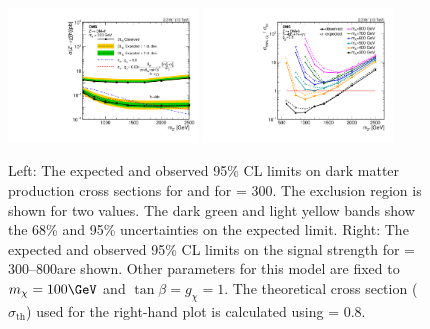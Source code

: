 \begin{figure}[htbp]
\centering
\includegraphics[width=0.45\textwidth]{EXO-16-012/Figure_009-a.pdf}
\includegraphics[width=0.45\textwidth]{EXO-16-012/Figure_009-b.pdf}
\caption{Left: The expected and observed 95\% CL limits
on dark matter production cross sections for \Hbb and \HGG for \maz = 300\GeV. The exclusion region is shown for two
\gzp values. The dark green and light yellow  bands show the 68\% and 95\% uncertainties on the expected limit.
Right: The expected and observed 95\% CL limits on the signal strength for \maz = 300--800\GeV are shown.
Other parameters for this model are fixed to $m_{\chi} = 100\GeV$ and $\tan{\beta} = g_{\chi} = 1$.
The theoretical cross section ($\sigma_{\mathrm{th}}$) used for the right-hand plot is calculated using \gzp = 0.8.}
\label{fig:limitsexpected}
\end{figure}


